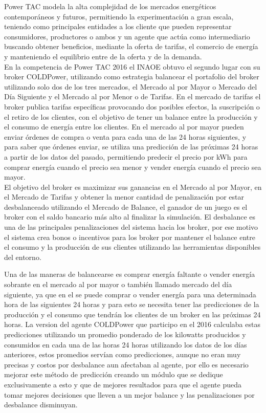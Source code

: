 Power TAC modela la alta complejidad de los mercados energéticos contemporáneos y futuros, permitiendo la experimentación a gran escala, teniendo como principales entidades a los cliente que pueden representar consumidores,  productores o ambos y un agente que actúa como intermediario buscando obtener beneficios, mediante la oferta de tarifas, el comercio de energía y manteniendo el equilibrio entre de la oferta y de la demanda.
\\
 
En la competencia de Power TAC 2016 el INAOE obtuvo el segundo lugar con su broker COLDPower, utilizando como estrategia balancear el portafolio del broker utilizando solo dos de los tres mercados, el Mercado al por Mayor o Mercado del Día Siguiente y el Mercado al por Menor o de Tarifas. 
En el mercado de tarifas el broker publica tarifas específicas provocando dos posibles efectos, la suscripción o el retiro de los clientes, con el objetivo de tener un balance entre la producción y el consumo de energía entre los clientes. 
En el mercado al por mayor pueden enviar órdenes de compra o venta para cada una de las 24 horas siguientes, y para saber que órdenes enviar, se utiliza una predicción de las próximas 24 horas a partir de los datos del pasado, permitiendo predecir el precio por kWh para comprar energía cuando el precio sea menor y vender energía cuando el precio sea mayor.
\\
 
El objetivo del broker es maximizar sus ganancias en el  Mercado al por Mayor, en el Mercado de Tarifas y obtener la menor cantidad de penalización por estar desbalanceado utilizando el Mercado de Balance, el ganador de un juego es el broker con el saldo bancario más alto al finalizar la simulación. 
El desbalance es una de las principales penalizaciones del sistema hacia los broker, por ese motivo el sistema crea bonos o incentivos para los broker por mantener el balance entre el consumo y la producción de sus clientes utilizando las herramientas disponibles del entorno.

Una de las maneras de balancearse es comprar energía faltante o vender energía sobrante en el mercado al por mayor o también llamado mercado del día siguiente, ya que en el se puede comprar o vender energía para una determinada hora de las siguientes 24 horas y para esto se necesita tener las predicciones de la producción y el consumo que tendrán los clientes de un broker en las próximas 24 horas.
La version del agente COLDPower que participo en el 2016 calculaba estas predicciones utilizando un promedio ponderado de los kilowatts producidos y consumidos en cada una de las horas 24 horas utilizando los datos de los días anteriores, estos promedios servían como predicciones, aunque no eran muy precisas y costos por desbalance aun afectaban al agente, por ello es necesario mejorar este método de predicción creando un módulo que se dedique exclusivamente a esto y que de mejores resultados para que el agente pueda tomar mejores decisiones que lleven a un mejor balance y las penalizaciones por desbalance disminuyan.

